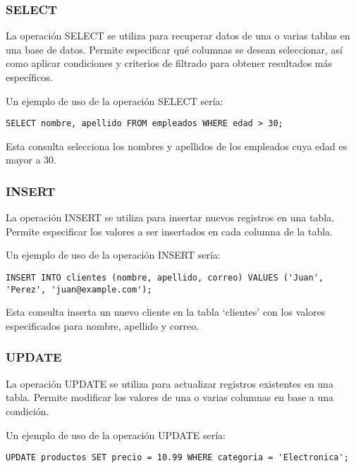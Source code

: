 \documentclass[executivepaper]{article}
\begin{document}
\subsubsection*{SELECT}

La operación SELECT se utiliza para recuperar datos de una o varias tablas en una base de datos. Permite especificar qué columnas se desean seleccionar, así como aplicar condiciones y criterios de filtrado para obtener resultados más específicos.

Un ejemplo de uso de la operación SELECT sería:

\begin{lstlisting}
SELECT nombre, apellido FROM empleados WHERE edad > 30;
\end{lstlisting}

Esta consulta selecciona los nombres y apellidos de los empleados cuya edad es mayor a 30.

\subsubsection*{INSERT}

La operación INSERT se utiliza para insertar nuevos registros en una tabla. Permite especificar los valores a ser insertados en cada columna de la tabla.

Un ejemplo de uso de la operación INSERT sería:

\begin{lstlisting}
INSERT INTO clientes (nombre, apellido, correo) VALUES ('Juan', 'Perez', 'juan@example.com');
\end{lstlisting}

Esta consulta inserta un nuevo cliente en la tabla \enquote*{clientes} con los valores especificados para nombre, apellido y correo.

\subsubsection*{UPDATE}

La operación UPDATE se utiliza para actualizar registros existentes en una tabla. Permite modificar los valores de una o varias columnas en base a una condición.

Un ejemplo de uso de la operación UPDATE sería:

\begin{lstlisting}
UPDATE productos SET precio = 10.99 WHERE categoria = 'Electronica';
\end{lstlisting}
\end{document}
